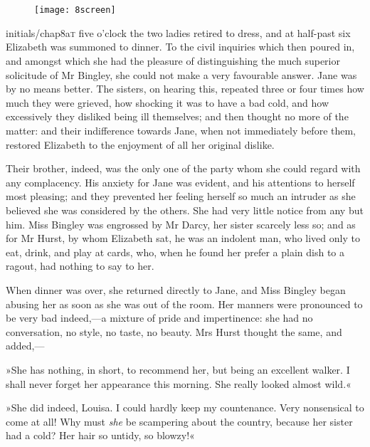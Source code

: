 \chapter[Chapter \thechapter]{}
	
\begin{figure}[t!]
\centering
\texttt{[image: 8screen]}
\end{figure}

\lettrine[lines=6,image=true]{initials/chap8a}{t}  five o'clock the two ladies retired to dress, and at half-past six Elizabeth was summoned to dinner. To the civil inquiries which then poured in, and amongst which she had the pleasure of distinguishing the much superior solicitude of Mr Bingley, she could not make a very favourable answer. Jane was by no means better. The sisters, on hearing this, repeated three or four times how much they were grieved, how shocking it was to have a bad cold, and how excessively they disliked being ill themselves; and then thought no more of the matter: and their indifference towards Jane, when not immediately before them, restored Elizabeth to the enjoyment of all her original dislike.

Their brother, indeed, was the only one of the party whom she could regard with any complacency. His anxiety for Jane was evident, and his attentions to herself most pleasing; and they prevented her feeling herself so much an intruder as she believed she was considered by the others. She had very little notice from any but him. Miss Bingley was engrossed by Mr Darcy, her sister scarcely less so; and as for Mr Hurst, by whom Elizabeth sat, he was an indolent man, who lived only to eat, drink, and play at cards, who, when he found her prefer a plain dish to a ragout, had nothing to say to her.

When dinner was over, she returned directly to Jane, and Miss Bingley began abusing her as soon as she was out of the room. Her manners were pronounced to be very bad indeed,—a mixture of pride and impertinence: she had no conversation, no style, no taste, no beauty. Mrs Hurst thought the same, and added,—

»She has nothing, in short, to recommend her, but being an excellent walker. I shall never forget her appearance this morning. She really looked almost wild.«

»She did indeed, Louisa. I could hardly keep my countenance. Very nonsensical to come at all! Why must \textit{she} be scampering about the country, because her sister had a cold? Her hair so untidy, so blowzy!«

